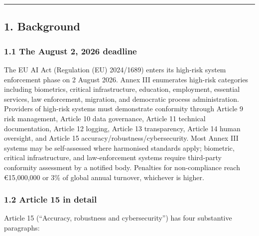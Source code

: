 \documentclass[
]{article}
\begin{document}
\begin{center}\rule{0.5\linewidth}{0.5pt}\end{center}

\subsection{1. Background}\label{background}

\subsubsection{1.1 The August 2, 2026
deadline}\label{the-august-2-2026-deadline}

The EU AI Act (Regulation (EU) 2024/1689) enters its high-risk system
enforcement phase on 2 August 2026. Annex III enumerates high-risk
categories including biometrics, critical infrastructure, education,
employment, essential services, law enforcement, migration, and
democratic process administration. Providers of high-risk systems must
demonstrate conformity through Article 9 risk management, Article 10
data governance, Article 11 technical documentation, Article 12 logging,
Article 13 transparency, Article 14 human oversight, and Article 15
accuracy/robustness/cybersecurity. Most Annex III systems may be
self-assessed where harmonised standards apply; biometric, critical
infrastructure, and law-enforcement systems require third-party
conformity assessment by a notified body. Penalties for non-compliance
reach €15,000,000 or 3\% of global annual turnover, whichever is higher.

\subsubsection{1.2 Article 15 in detail}\label{article-15-in-detail}

Article 15 (``Accuracy, robustness and cybersecurity'') has four
substantive paragraphs:
\end{document}

